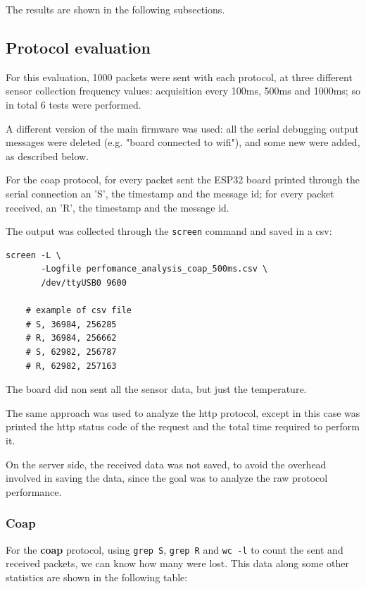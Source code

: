 \documentclass[]{article}
\begin{document}
The results are shown in the following subsections.

\subsection{Protocol evaluation}
For this evaluation, 1000 packets were sent with each protocol, at three different sensor collection frequency values: acquisition every 100ms, 500ms and 1000ms; so in total 6 tests were performed. 

A different version of the main firmware was used: all the serial debugging output messages were deleted (e.g. "board connected to wifi"), and some new were added, as described below.

For the coap protocol, for every packet sent the ESP32 board printed through the serial connection an 'S', the timestamp and the message id; for every packet received, an 'R', the timestamp and the message id. 

The output was collected through the \texttt{screen} command and saved in a csv:

\begin{lstlisting}[style=bash, caption=Command to capture the board serial output]
	screen -L \ 
	   -Logfile perfomance_analysis_coap_500ms.csv \
	   /dev/ttyUSB0 9600
	
	# example of csv file
 	# S, 36984, 256285
	# R, 36984, 256662
	# S, 62982, 256787
	# R, 62982, 257163
\end{lstlisting}

The board did non sent all the sensor data, but just the temperature.

The same approach was used to analyze the http protocol, except in this case was printed the http status code of the request and the total time required to perform it. 

On the server side, the received data was not saved, to avoid the overhead involved in saving the data, since the goal was to analyze the raw protocol performance. 

\subsubsection{Coap}
For the \textbf{coap} protocol, using \texttt{grep S}, \texttt{grep R} and \texttt{wc -l} to count the sent and received packets, we can know how many were lost. This data along some other statistics are shown in the following table:
\end{document}
